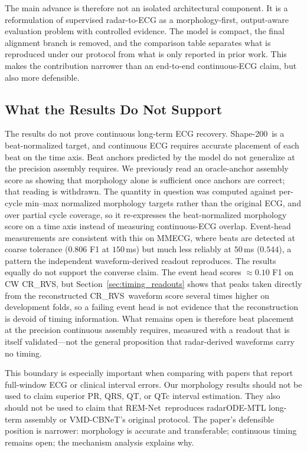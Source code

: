 \documentclass[lettersize,journal]{IEEEtran}
\newcommand{\remnet}{REM-Net\xspace}
\newcommand{\shape}{Shape-200\xspace}
\newcommand{\crrvs}{CR\_RVS\xspace}
\begin{document}
The main advance is therefore not an isolated architectural component. It is a reformulation of supervised radar-to-ECG as a morphology-first, output-aware evaluation problem with controlled evidence. The model is compact, the final alignment branch is removed, and the comparison table separates what is reproduced under our protocol from what is only reported in prior work. This makes the contribution narrower than an end-to-end continuous-ECG claim, but also more defensible.

\subsection{What the Results Do Not Support}
The results do not prove continuous long-term ECG recovery. \shape\ is a beat-normalized target, and continuous ECG requires accurate placement of each beat on the time axis. Beat anchors predicted by the model do not generalize at the precision assembly requires. We previously read an oracle-anchor assembly score as showing that morphology alone is sufficient once anchors are correct; that reading is withdrawn. The quantity in question was computed against per-cycle min--max normalized morphology targets rather than the original ECG, and over partial cycle coverage, so it re-expresses the beat-normalized morphology score on a time axis instead of measuring continuous-ECG overlap. Event-head measurements are consistent with this on MMECG, where beats are detected at coarse tolerance ($0.806$ F1 at $150$\,ms) but much less reliably at $50$\,ms ($0.544$), a pattern the independent waveform-derived readout reproduces. The results equally do not support the converse claim. The event head scores $\approx 0.10$ F1 on CW \crrvs, but Section~\ref{sec:timing_readouts} shows that peaks taken directly from the reconstructed \crrvs\ waveform score several times higher on development folds, so a failing event head is not evidence that the reconstruction is devoid of timing information. What remains open is therefore beat placement at the precision continuous assembly requires, measured with a readout that is itself validated---not the general proposition that radar-derived waveforms carry no timing.

This boundary is especially important when comparing with papers that report full-window ECG or clinical interval errors. Our morphology results should not be used to claim superior PR, QRS, QT, or QTc interval estimation. They also should not be used to claim that \remnet\ reproduces radarODE-MTL long-term assembly or VMD-CBNeT's original protocol. The paper's defensible position is narrower: morphology is accurate and transferable; continuous timing remains open; the mechanism analysis explains why.
\end{document}
